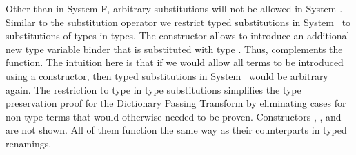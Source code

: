 \noindent Other than in System F, arbitrary substitutions will not be allowed in System \Fo. 
Similar to the substitution operator we restrict typed substitutions in System \Fo\ to substitutions of types in types. 
\FoSubTyping
\noindent The constructor  allows to introduce an additional new type variable binder that is substituted with type .
Thus,  complements the  function. 
The intuition here is that if we would allow all terms to be introduced using a  constructor, then typed substitutions in System \Fo\ would be arbitrary again. 
The restriction to type in type substitutions simplifies the type preservation proof for the Dictionary Passing Transform by eliminating cases for non-type terms that would otherwise needed to be proven.
Constructors  , ,  and  are not shown. All of them function the same way as their counterparts in typed renamings.